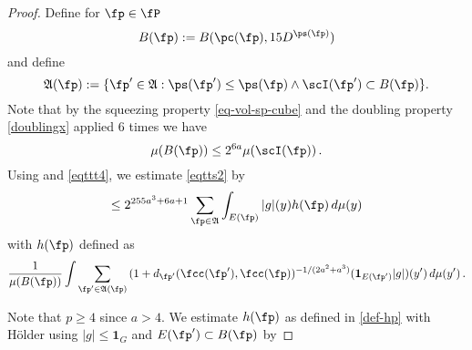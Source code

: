 \begin{proof}
Define for $\fp\in \fP$
\begin{equation}
    B(\fp):=B(\pc(\fp), 15D^{\ps(\fp)})
\end{equation}
and define
\begin{equation}
    \label{eq-Dp-definition}
    \mathfrak{A}(\fp):=\{\fp'\in\mathfrak{A}: \ps(\fp')\leq \ps(\fp) \land \scI(\fp') \subset B(\fp)\}.
\end{equation}
Note that by the squeezing property \eqref{eq-vol-sp-cube}
and the doubling property \eqref{doublingx} applied
$6$ times we have
\begin{equation}\label{eqttt4}
    \mu(B(\fp))\le 2^{6a} \mu(\scI(\fp))\, .
\end{equation}
Using  and \eqref{eqttt4}, we estimate \eqref{eqtts2} by
\begin{equation}\label{eqtts3}
     \le 2^{255a^3+6a+1} \sum_{\fp\in \mathfrak{A}}
    \int_{E(\fp)}|g|(y) h(\fp)\, d\mu(y)
\end{equation}
with $h(\fp)$ defined as
\begin{equation}\label{def-hp}
    \frac 1{\mu(B(\fp))}\int \sum_{\fp'\in \mathfrak{A}(\fp)}
    {(1+d_{\fp'}(\fcc(\fp'), \fcc(\fp))^{-1/(2a^2+a^3)}}(\mathbf{1}_{E(\fp')}|g|)(y')\, d\mu(y')\,.
\end{equation}


Note that $p\geq 4$ since $a>4$.
We estimate $h(\fp)$ as defined in \eqref{def-hp} with H\"older using $|g|\le \mathbf{1}_G$ and $E(\fp')\subset B(\fp)$ by


\end{proof}
